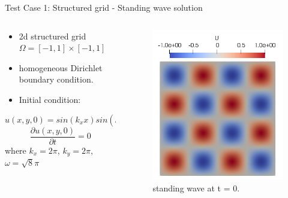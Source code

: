 \documentclass[10pt, aspectratio=169]{beamer}
\begin{document}
\begin{frame}{Test Case 1: Structured grid - Standing wave solution}
																	
	\begin{columns}
		\begin{column}{0.45\textwidth}
			\begin{itemize}
				\item 2d structured grid $\Omega = [-1,1]\times[-1,1]$
				\item homogeneous Dirichlet boundary condition.
				\item Initial condition:
			\end{itemize}
			$$u(x,y,0) = sin(k_{x}x)sin(k_{y}y)$$
			$$\frac{\partial u(x,y,0)}{\partial t} = 0$$
			where $k_{x} = {2\pi}$, $k_{y} = {2\pi}$, $\omega = \sqrt{8}\pi$
		\end{column}
																																			
		\begin{column}{0.45\textwidth}
			\begin{figure}
				\centering
				\includegraphics[scale=0.38]{standing_wave.png}
				\caption{standing wave at t = 0.}
			\end{figure}
		\end{column}
	\end{columns}
\end{frame}
\end{document}

